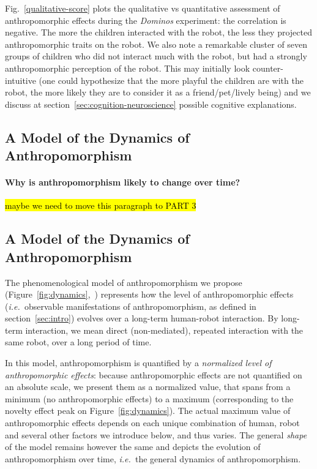 \documentclass{frontiersSCNS} %
\newcommand{\ie}{{\textit{i.e.~}}}
\begin{document}
Fig.~\ref{qualitative-score} plots the qualitative vs quantitative assessment of
anthropomorphic effects during the \emph{Dominos} experiment: the correlation is
negative. The more the children interacted with the robot, the less they
projected anthropomorphic traits on the robot. We also note a remarkable cluster
of seven groups of children who did not interact much with the robot, but had a
strongly anthropomorphic perception of the robot. This may initially look
counter-intuitive (one could hypothesize that the more playful the children are
with the robot, the more likely they are to consider it as a friend/pet/lively
being) and we discuss at section~\ref{sec:cognition-neuroscience} possible
cognitive explanations.

\subsection{A Model of the Dynamics of Anthropomorphism}
\label{sec:dynamics-model}

\paragraph{Why is anthropomorphism likely to change over time?}
\hl{maybe we need to move this paragraph to PART 3}


\subsection{A Model of the Dynamics of Anthropomorphism}

The phenomenological model of anthropomorphism we propose
(Figure~\ref{fig:dynamics},~\cite{lemaignan2014dynamics}) represents how the
level of anthropomorphic effects (\ie observable manifestations of
anthropomorphism, as defined in section~\ref{sec:intro}) evolves over a
long-term human-robot interaction. By long-term interaction, we mean direct
(non-mediated), repeated interaction with the same robot, over a long period of
time. 

In this model, anthropomorphism is quantified by a \emph{normalized level of
anthropomorphic effects}: because anthropomorphic effects are not quantified on
an absolute scale, we present them as a normalized value, that spans from a
minimum (no anthropomorphic effects) to a maximum (corresponding to the novelty
effect peak on Figure~\ref{fig:dynamics}). The actual maximum value of
anthropomorphic effects depends on each unique combination of human, robot and
several other factors we introduce below, and thus varies. The general
\emph{shape} of the model remains however the same and depicts the evolution of
anthropomorphism over time, \ie the general dynamics of anthropomorphism.
\end{document}

